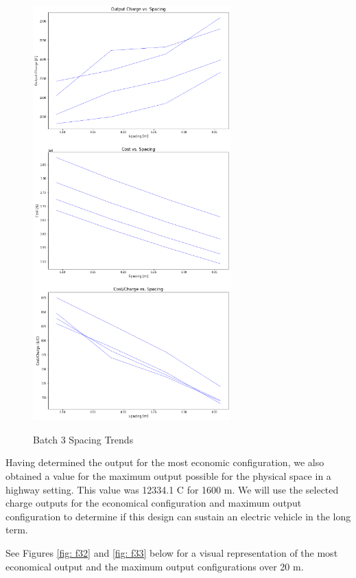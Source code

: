 \begin{figure}
    \begin{center}
    \includegraphics[width=3in]{fig31.png}
    \end{center}
    \renewcommand{\baselinestretch}{1}
    \small\normalsize
    \begin{quote}
    \caption[Batch 3 Spacing Trends]{Batch 3 Spacing Trends} \label{fig: f31}
    \end{quote}
\end{figure}

Having determined the output for the most economic configuration, we also obtained a value for the maximum output 
possible for the physical space in a highway setting. This value was 12334.1 C for 1600 m. 
We will use the selected charge outputs for the economical configuration and maximum output configuration to 
determine if this design can sustain an electric vehicle in the long term. 

See Figures \ref{fig: f32} and \ref{fig: f33} below for a visual representation of the most economical output and the maximum output configurations 
over 20 m.

